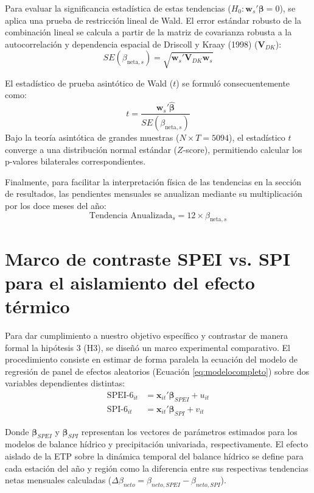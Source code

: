 Para evaluar la significancia estadística de estas tendencias ($H_0: \mathbf{w}_s' \boldsymbol{\beta} = 0$), se aplica una prueba de restricción lineal de Wald. El error estándar robusto de la combinación lineal se calcula a partir de la matriz de covarianza robusta a la autocorrelación y dependencia espacial de Driscoll y Kraay (1998) ($\mathbf{V}_{DK}$):
\begin{equation}
    SE(\beta_{\text{neta}, s}) = \sqrt{\mathbf{w}_s' \mathbf{V}_{DK} \mathbf{w}_s}
\end{equation}

El estadístico de prueba asintótico de Wald ($t$) se formuló consecuentemente como:
\begin{equation}
    t = \frac{\mathbf{w}_s' \boldsymbol{\hat{\beta}}}{SE(\beta_{\text{neta}, s})}
\end{equation}
Bajo la teoría asintótica de grandes muestras ($N \times T = 5094$), el estadístico $t$ converge a una distribución normal estándar ($Z$-score), permitiendo calcular los p-valores bilaterales correspondientes. 

Finalmente, para facilitar la interpretación física de las tendencias en la sección de resultados, las pendientes mensuales se anualizan mediante su multiplicación por los doce meses del año:
\begin{equation}
    \text{Tendencia Anualizada}_s = 12 \times \beta_{\text{neta}, s}
\label{eq:anualizacion}
\end{equation}

\section{Marco de contraste SPEI vs. SPI para el aislamiento del efecto térmico}

Para dar cumplimiento a nuestro objetivo específico y contrastar de manera formal la hipótesis 3 (H3), se diseñó un marco experimental comparativo. El procedimiento consiste en estimar de forma paralela la ecuación del modelo de regresión de panel de efectos aleatorios (Ecuación \ref{eq:modelocompleto}) sobre dos variables dependientes distintas:
\begin{align}
    \text{SPEI-6}_{it} &= \mathbf{x}_{it}'\boldsymbol{\beta}_{SPEI} + u_{it} \label{eq:panel_spei} \\
    \text{SPI-6}_{it} &= \mathbf{x}_{it}'\boldsymbol{\beta}_{SPI} + v_{it} \label{eq:panel_spi}
\end{align}

Donde $\boldsymbol{\beta}_{SPEI}$ y $\boldsymbol{\beta}_{SPI}$ representan los vectores de parámetros estimados para los modelos de balance hídrico y precipitación univariada, respectivamente. El efecto aislado de la ETP sobre la dinámica temporal del balance hídrico se define para cada estación del año y región como la diferencia entre sus respectivas tendencias netas mensuales calculadas ($\Delta \beta_{neto} = \beta_{neto, SPEI} - \beta_{neto, SPI}$). 

